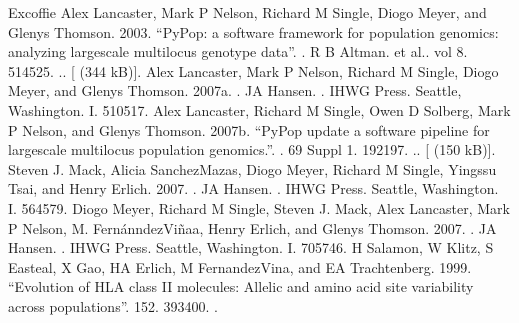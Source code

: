 \documentclass[letterpaper,10pt,english,openany,oneside]{sphinxmanual}
\begin{document}
\begin{sphinxthebibliography}{Excoffie}
Alex Lancaster, Mark P Nelson, Richard M
Single, Diogo Meyer, and Glenys Thomson. 2003. “PyPop: a software
framework for population genomics: analyzing large\sphinxhyphen{}scale
multi\sphinxhyphen{}locus genotype data”. .
R B Altman. et al.. vol 8. 514\sphinxhyphen{}525. .. {[} (344 kB){]}.
\sphinxAtStartPar
Alex Lancaster, Mark P Nelson, Richard M
Single, Diogo Meyer, and Glenys Thomson. 2007a. . JA Hansen. . IHWG Press. Seattle,
Washington. I. 510\sphinxhyphen{}517.
\sphinxAtStartPar
Alex Lancaster, Richard M Single, Owen D
Solberg, Mark P Nelson, and Glenys Thomson. 2007b. “PyPop update \sphinxhyphen{}
a software pipeline for large\sphinxhyphen{}scale multilocus population
genomics.”. . 69 Suppl 1. 192\sphinxhyphen{}197.
.. {[}
(150 kB){]}.
\sphinxAtStartPar
Steven J. Mack, Alicia Sanchez\sphinxhyphen{}Mazas, Diogo
Meyer, Richard M Single, Yingssu Tsai, and Henry Erlich. 2007.
.
JA Hansen. .
IHWG Press. Seattle, Washington. I. 564\sphinxhyphen{}579.
\sphinxAtStartPar
Diogo Meyer, Richard M Single, Steven J. Mack,
Alex Lancaster, Mark P Nelson, M. Fernánndez\sphinxhyphen{}Viñaa, Henry Erlich,
and Glenys Thomson. 2007. . JA Hansen.
. IHWG
Press. Seattle, Washington. I. 705\sphinxhyphen{}746.
\sphinxAtStartPar
H Salamon, W Klitz, S Easteal, X Gao, HA
Erlich, M Fernandez\sphinxhyphen{}Vina, and EA Trachtenberg. 1999. “Evolution of
HLA class II molecules: Allelic and amino acid site variability
across populations”. 152. 393\sphinxhyphen{}400. .

\end{sphinxthebibliography}
\end{document}
